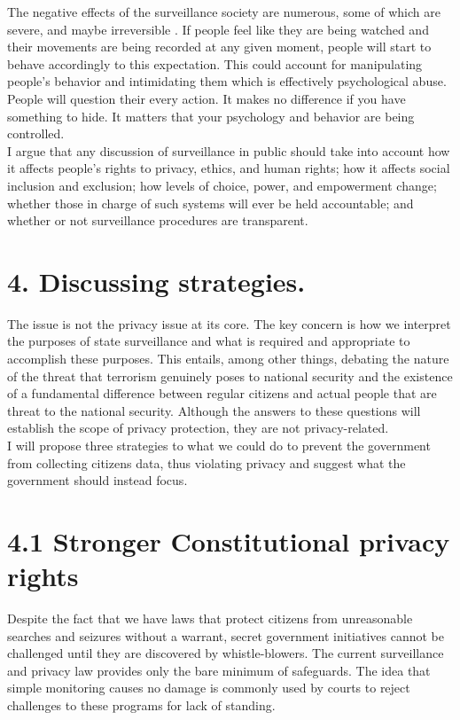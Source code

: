 \documentclass[11pt]{report}
\begin{document}
The negative effects of the surveillance society are numerous, some of which are severe, and maybe irreversible \cite{surveillance_society}.  If people feel like they are being watched and their movements are being recorded at any given moment, people will start to behave accordingly to this expectation. This could account for manipulating people's behavior and intimidating them which is effectively psychological abuse. People will question their every action. It makes no difference if you have something to hide. It matters that your psychology and behavior are being controlled. \\

I argue that any discussion of surveillance in public should take into account how it affects people's rights to privacy, ethics, and human rights; how it affects social inclusion and exclusion; how levels of choice, power, and empowerment change; whether those in charge of such systems will ever be held accountable; and whether or not surveillance procedures are transparent.

\section*{4. Discussing strategies.}

The issue is not the privacy issue at its core. The key concern is how we interpret the purposes of state surveillance and what is required and appropriate to accomplish these purposes. This entails, among other things, debating the nature of the threat that terrorism genuinely poses to national security and the existence of a fundamental difference between regular citizens and actual people that are threat to the national security. Although the answers to these questions will establish the scope of privacy protection, they are not privacy-related.\\

I will propose three strategies to what we could do to prevent the government from collecting citizens data, thus violating privacy and suggest what the government should instead focus.


\section*{4.1 Stronger Constitutional privacy rights}

Despite the fact that we have laws that protect citizens from unreasonable searches and seizures without a warrant, secret government initiatives cannot be challenged until they are discovered by whistle-blowers. The current surveillance and privacy law provides only the bare minimum of safeguards. The idea that simple monitoring causes no damage is commonly used by courts to reject challenges to these programs for lack of standing.\\
\end{document}
